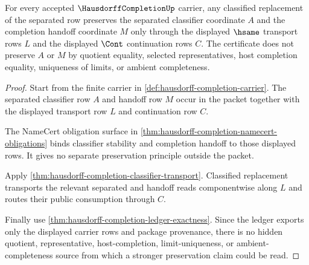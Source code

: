 \begin{theorem}
\label{thm:hausdorff-completion-separated-transport-certificate}
For every accepted $\HausdorffCompletionUp$ carrier, any classified replacement of the separated row preserves the separated classifier coordinate $A$ and the completion handoff coordinate $M$ only through the displayed $\hsame$ transport rows $L$ and the displayed $\Cont$ continuation rows $C$. The certificate does not preserve $A$ or $M$ by quotient equality, selected representatives, host completion equality, uniqueness of limits, or ambient completeness.
\end{theorem}
\begin{proof}
Start from the finite carrier in \autoref{def:hausdorff-completion-carrier}. The separated classifier row $A$ and handoff row $M$ occur in the packet together with the displayed transport row $L$ and continuation row $C$.

The NameCert obligation surface in \autoref{thm:hausdorff-completion-namecert-obligations} binds classifier stability and completion handoff to those displayed rows. It gives no separate preservation principle outside the packet.

Apply \autoref{thm:hausdorff-completion-classifier-transport}. Classified replacement transports the relevant separated and handoff reads componentwise along $L$ and routes their public consumption through $C$.

Finally use \autoref{thm:hausdorff-completion-ledger-exactness}. Since the ledger exports only the displayed carrier rows and package provenance, there is no hidden quotient, representative, host-completion, limit-uniqueness, or ambient-completeness source from which a stronger preservation claim could be read.
\end{proof}

